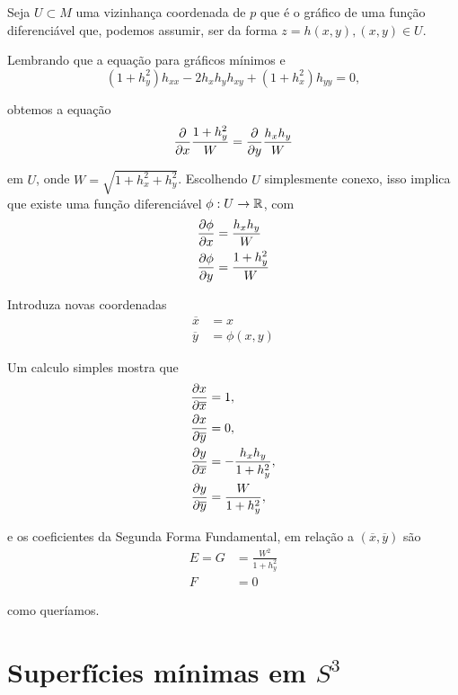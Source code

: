 \begin{demonstracao}
	Seja $U \subset M$ uma vizinhança coordenada de $p$ que é o gráfico de uma função diferenciável que, podemos assumir, ser da forma $z = h(x,y), (x,y) \in U$.
	
	Lembrando que a equação para gráficos mínimos e
	\begin{equation*}
	(1 + h_y^2) h_{xx} - 2 h_x h_y h_{xy} + (1 + h_x^2) h_{yy} = 0,
	\end{equation*}
	
	obtemos a equação
	\begin{equation*}
	\frac{\partial}{\partial x} \frac{1 + h_y^2}{W} = \frac{\partial}{\partial y} \frac{h_x h_y}{W}
	\end{equation*}
	
	em $U$, onde $W = \sqrt{1 + h_x^2 + h_y^2}$. Escolhendo $U$ simplesmente conexo, isso implica que existe uma função diferenciável $\phi: U \rightarrow \mathbb{R}$, com
	\begin{align*}
	\frac{\partial \phi}{\partial x} &= \frac{h_x h_y}{W} \\
	\frac{\partial \phi}{\partial y} &= \frac{1 + h_y^2}{W}
	\end{align*}
	
	Introduza novas coordenadas
	\begin{align*}
	\overline{x} &= x \\
	\overline{y} &= \phi(x,y)
	\end{align*}
	
	Um calculo simples mostra que
	\begin{align*}
	\frac{\partial x}{\partial \overline{x}} &= 1, \\
	\frac{\partial x}{\partial \overline{y}} &= 0, \\
	\frac{\partial y}{\partial \overline{x}} &= -\frac{h_x h_y}{1 + h_y^2}, \\
	\frac{\partial y}{\partial \overline{y}} &= \frac{W}{1 + h_y^2},
	\end{align*}
	
	e os coeficientes da Segunda Forma Fundamental, em relação a $(\overline{x}, \overline{y})$ são
	\begin{align*}
	E = G &= \frac{W^2}{1 + h_y^2} \\
	F &= 0
	\end{align*}
	
	como queríamos.
\end{demonstracao}

\section{Superfícies mínimas em $S^3$}

